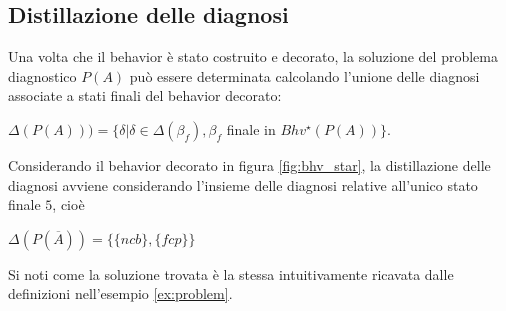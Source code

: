 \subsection{Distillazione delle diagnosi}
Una volta che il behavior è stato costruito e decorato, la soluzione del problema diagnostico $P(A)$ può essere determinata calcolando l'unione delle diagnosi associate a stati finali del behavior decorato:
\begin{center}
$\Delta(P(A))) = \{\delta | \delta \in \Delta(\beta_f), \beta_f$ finale in $Bhv^\star(P(A))\}$.
\end{center}


\begin{ex}
Considerando il behavior decorato in figura \ref{fig:bhv_star}, la distillazione delle diagnosi avviene considerando l'insieme delle diagnosi relative all'unico stato finale $5$, cioè
\begin{center}
$\Delta(P(\overline{A})) = \{\{\mathit{ncb}\},\{\mathit{fcp}\}\}$
\end{center}
Si noti come la soluzione trovata è la stessa intuitivamente ricavata dalle definizioni nell'esempio \ref{ex:problem}.
\end{ex}